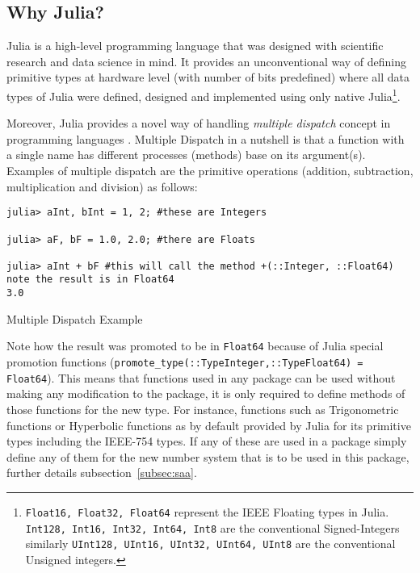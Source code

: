 \subsection{Why Julia?}

Julia \cite{Julia,Bezanson2017} is a high-level programming language that was designed with scientific research and data science in mind. It provides an unconventional way of defining primitive types at hardware level (with number of bits predefined) where all data types of Julia were defined, designed and implemented using only native Julia\footnote{\texttt{Float16, Float32, Float64} represent the IEEE Floating types in Julia. \texttt{Int128, Int16, Int32, Int64, Int8} are the conventional Signed-Integers similarly \texttt{UInt128, UInt16, UInt32, UInt64, UInt8} are the conventional Unsigned integers.}.

Moreover, Julia provides a novel way of handling \emph{multiple dispatch} \cite{WikiMultipleDispatch} concept in programming languages \cite{JuliaMehtods}. Multiple Dispatch in a nutshell is that a function with a single name has different processes (methods) base on its argument(s). Examples of multiple dispatch are the primitive operations (addition, subtraction, multiplication and division) as follows:

\begin{listing}[H]
\begin{verbatim}
julia> aInt, bInt = 1, 2; #these are Integers

julia> aF, bF = 1.0, 2.0; #there are Floats

julia> aInt + bF #this will call the method +(::Integer, ::Float64) note the result is in Float64
3.0
\end{verbatim}
\caption{Multiple Dispatch Example}
\end{listing}

Note how the result was promoted to be in \texttt{Float64} because of Julia special promotion functions (\texttt{promote_type(::Type{Integer},::Type{Float64}) = Float64}). This means that functions used in any package can be used without making any modification to the package, it is only required to define methods of those functions for the new type. For instance, functions such as Trigonometric functions or Hyperbolic functions as by default provided by Julia for its primitive types including the IEEE-754 types. If any of these are used in a package simply define any of them for the new number system that is to be used in this package, further details subsection~\ref{subsec:saa}.

